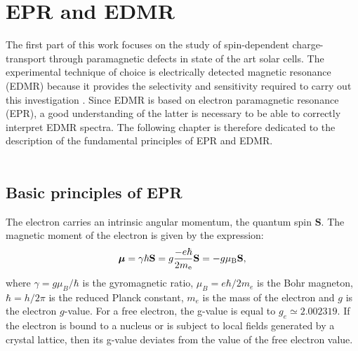 \documentclass[a4paper]{book}
\newcommand{\tsub}{\textsubscript}
\newcommand{\mb}{\mathbf}
\begin{document}
	\chapter{EPR and EDMR}
	The first part of this work focuses on the study of spin-dependent charge-transport through paramagnetic defects in state of the art solar cells. The experimental technique of choice is electrically detected magnetic resonance (EDMR) because it provides the selectivity and sensitivity required to carry out this investigation \cite{schneggPulsedElectricallyDetected2012}.
	Since EDMR is based on electron paramagnetic resonance (EPR), a good understanding of the latter is necessary to be able to correctly interpret EDMR spectra. The following chapter is therefore dedicated to the description of the fundamental principles of EPR and EDMR.\\\\
	
	
	\section{Basic principles of EPR}
	\label{sec:2_basic_principles_EPR}
	The electron carries an intrinsic angular momentum, the quantum spin $\mb{S}$. The magnetic moment of the electron is given by the expression:
	\begin{equation}
		\boldsymbol\mu = \gamma\hbar\mb{S} = g\frac{-e\hbar}{2m\tsub{e}}\mb{S} = -g\mu\tsub{B}\mb{S},
		\label{eq:2_electron_mu}
	\end{equation}
	where $\gamma = g\mu_B/\hbar$ is the gyromagnetic ratio, $\mu_B = e\hbar/2m_e $ is the Bohr magneton, $\hbar=h/2\pi$ is the reduced Planck constant, $m_e$ is the mass of the electron and $g$ is the electron $g$-value. For a free electron, the g-value is equal to $g_e \simeq 2.002319$. If the electron is bound to a nucleus or is subject to local fields generated by a crystal lattice, then its g-value deviates from the value of the free electron value.
	
\end{document}
